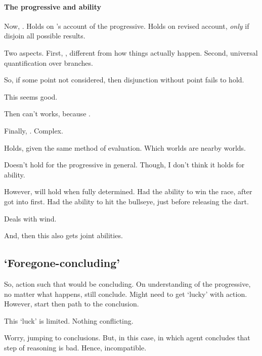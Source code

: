 \paragraph{The progressive and ability}

\begin{note}
  Now, \BoyVS{}.
  Holds on \citeauthor{Landman:1992wh}'s account of the progressive.
  Holds on revised account, \emph{only} if disjoin all possible results.

  Two aspects.
  First, \AlgGetPStops{}, different from how things actually happen.
  Second, universal quantification over branches.

  So, if some point not considered, then disjunction without point fails to hold.

  This seems good.

  Then can't works, because \AlgGetPStops{}.

  Finally, \BoyPS{}.
  Complex.

  Holds, given the same method of evaluation.
  Which worlds are nearby worlds.

  Doesn't hold for the progressive in general.
  Though, I don't think it holds for ability.

  However, will hold when fully determined.
  Had the ability to win the race, after got into first.
  Had the ability to hit the bullseye, just before releasing the dart.

  Deals with wind.

  And, then this also gets joint abilities.
\end{note}

\subsection{`Foregone-concluding'}
\label{sec:fc-progressive}

\begin{note}
  So, action such that would be concluding.
  On understanding of the progressive, no matter what happens, still conclude.
  Might need to get `lucky' with action.
  However, start then path to the conclusion.

  This `luck' is limited.
  Nothing conflicting.
\end{note}

\begin{note}
  Worry, jumping to conclusions.
  But, in this case, \pevent{} in which agent concludes that step of reasoning is bad.
  Hence, incompatible.
\end{note}

